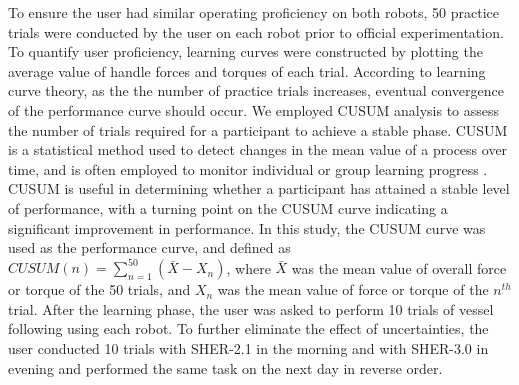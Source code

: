 \documentclass[letterpaper, 10 pt, conference]{ieeeconf}  %
\begin{document}
To ensure the user had similar operating proficiency on both robots, 50 practice trials were conducted by the user on each robot prior to official experimentation. To quantify user proficiency, learning curves were constructed by plotting the average value of handle forces and torques of each trial. %
According to learning curve theory, as the the number of practice trials increases, eventual convergence of the performance curve should occur. We employed CUSUM analysis to assess the number of trials required for a participant to achieve a stable phase. CUSUM is a statistical method used to detect changes in the mean value of a process over time, and is often employed to monitor individual or group learning progress \cite{nagakawa2018learning}. CUSUM is useful in determining whether a participant has attained a stable level of performance, with a turning point on the CUSUM curve indicating a significant improvement in performance. In this study, the CUSUM curve was used as the performance curve, and defined as $CUSUM(n) = \sum_{n=1}^{50} (\bar{X}-X_n)$, where $\bar{X}$ was the mean value of overall force or torque of the 50 trials, and $X_n$ was the mean value of force or torque of the $n^{th}$ trial. After the learning phase, the user was asked to perform 10 trials of vessel following using each robot. To further eliminate the effect of uncertainties, the user conducted 10 trials with SHER-2.1 in the morning and with SHER-3.0 in evening and performed the same task on the next day in reverse order.
\end{document}
